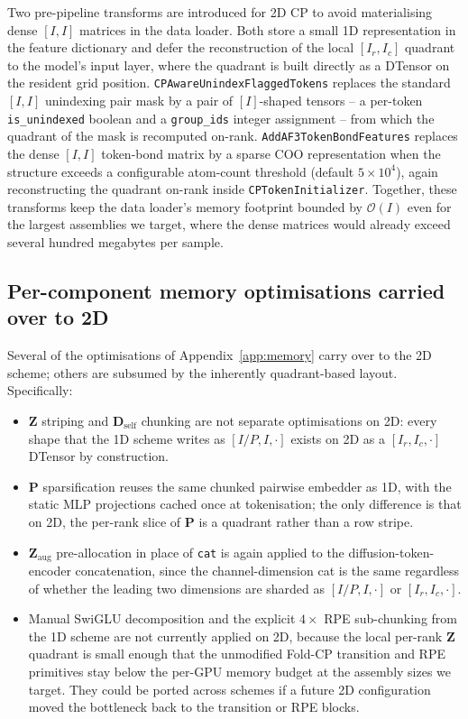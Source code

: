 \documentclass{article}
\theoremstyle{plain}
\theoremstyle{definition}
\theoremstyle{remark}
\begin{document}
Two pre-pipeline transforms are introduced for 2D CP to avoid materialising dense $[I, I]$ matrices in the data loader. Both store a small 1D representation in the feature dictionary and defer the reconstruction of the local $[I_r, I_c]$ quadrant to the model's input layer, where the quadrant is built directly as a DTensor on the resident grid position. \texttt{CPAwareUnindexFlaggedTokens} replaces the standard $[I, I]$ unindexing pair mask by a pair of $[I]$-shaped tensors -- a per-token \texttt{is\_unindexed} boolean and a \texttt{group\_ids} integer assignment -- from which the quadrant of the mask is recomputed on-rank. \texttt{AddAF3TokenBondFeatures} replaces the dense $[I, I]$ token-bond matrix by a sparse COO representation when the structure exceeds a configurable atom-count threshold (default $5\times10^{4}$), again reconstructing the quadrant on-rank inside \texttt{CPTokenInitializer}. Together, these transforms keep the data loader's memory footprint bounded by $\mathcal{O}(I)$ even for the largest assemblies we target, where the dense matrices would already exceed several hundred megabytes per sample.

\subsection{Per-component memory optimisations carried over to 2D}
\label{app:2d-memory}

Several of the optimisations of Appendix~\ref{app:memory} carry over to the 2D scheme; others are subsumed by the inherently quadrant-based layout. Specifically:
\begin{itemize}
\item $\mathbf{Z}$ striping and $\mathbf{D}_\text{self}$ chunking are not separate optimisations on 2D: every shape that the 1D scheme writes as $[I/P, I, \cdot]$ exists on 2D as a $[I_r, I_c, \cdot]$ DTensor by construction.
\item $\mathbf{P}$ sparsification reuses the same chunked pairwise embedder as 1D, with the static MLP projections cached once at tokenisation; the only difference is that on 2D, the per-rank slice of $\mathbf{P}$ is a quadrant rather than a row stripe.
\item $\mathbf{Z}_\text{aug}$ pre-allocation in place of \texttt{cat} is again applied to the diffusion-token-encoder concatenation, since the channel-dimension cat is the same regardless of whether the leading two dimensions are sharded as $[I/P, I, \cdot]$ or $[I_r, I_c, \cdot]$.
\item Manual SwiGLU decomposition and the explicit $4{\times}$ RPE sub-chunking from the 1D scheme are not currently applied on 2D, because the local per-rank $\mathbf{Z}$ quadrant is small enough that the unmodified Fold-CP transition and RPE primitives stay below the per-GPU memory budget at the assembly sizes we target. They could be ported across schemes if a future 2D configuration moved the bottleneck back to the transition or RPE blocks.
\end{itemize}
\end{document}
